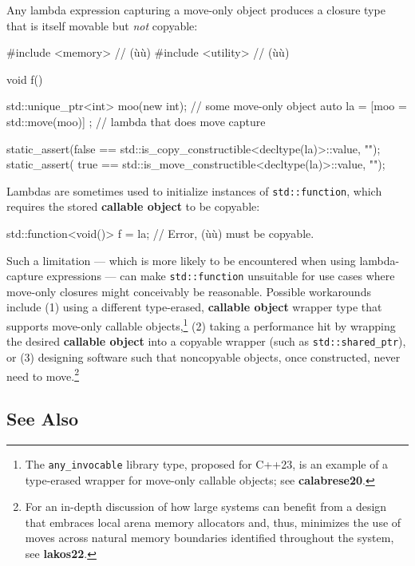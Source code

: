 Any lambda expression capturing a move-only object produces a closure
type that is itself movable but \emph{not} copyable:

\begin{emcppshiddenlisting}[emcppsbatch=e4,emcppsstandards={c++14}]
#include <memory>   // (ù{}ù)
#include <utility>  // (ù{}ù)
\end{emcppshiddenlisting}
\begin{emcppslisting}[emcppsbatch=e4]
void f()
{
    std::unique_ptr<int> moo(new int);    // some move-only object
    auto la = [moo = std::move(moo)]{ };  // lambda that does move capture

    static_assert(false == std::is_copy_constructible<decltype(la)>::value, "");
    static_assert( true == std::is_move_constructible<decltype(la)>::value, "");
}
\end{emcppslisting}
    
\noindent Lambdas are sometimes used to initialize instances of
\texttt{std::function}, which requires the stored \textbf{callable
object} to be copyable:

\begin{emcppslisting}
std::function<void()> f = la;  // Error, (ù{}ù) must be copyable.
\end{emcppslisting}
    
\noindent Such a limitation --- which is more likely to be encountered when using
lambda-capture expressions --- can make \texttt{std::function}
unsuitable for use cases where move-only closures might conceivably be
reasonable. Possible workarounds include (1) using a different
type-erased, \textbf{callable object} wrapper type that supports
move-only callable objects,{\cprotect\footnote{The
\texttt{any\_invocable} library type, proposed for C++23, is an
example of a type-erased wrapper for move-only callable objects; see
  \textbf{calabrese20}.}} (2) taking a performance hit by wrapping the
desired \textbf{callable object} into a copyable wrapper (such as
\texttt{std::shared\_ptr}), or (3) designing software such that
noncopyable objects, once constructed, never need to
move.\footnote{For an in-depth discussion of how large systems can
benefit from a design that embraces local arena memory allocators and,
thus, minimizes the use of moves across natural memory boundaries
identified throughout the system, see \textbf{lakos22}.}

\subsection[See Also]{See Also}\label{see-also}

